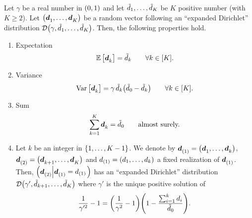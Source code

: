 \begin{prop}\label{prop:demand-distribution:properties}
Let $\gamma$ be a real number in $\bracket{0,1}$ and let $\tilde{d}_1,\ldots,\tilde{d}_K$ be $K$ positive number (with $K\ge2$).
Let $\bracket{\va\demand_1,\ldots,\va\demand_K}$ be a random vector following an ``expanded Dirichlet'' distribution $\cD\bracket{\gamma,\tilde{\demand}_1,\ldots,\tilde{\demand}_K}$.
Then, the following properties hold.
\begin{enumerate}
  \item\label{enum:PDP:random-demand-property:expectation}
  Expectation%
  \begin{equation}
    \espe\sqbracket{\va\demand_k} = \tilde{\demand}_k\qquad\forall k\in\range{K}.
  \end{equation}
  \item\label{enum:PDP:random-demand-property:variance}
  Variance%
  \begin{equation}\label{eq:PDP:numerical-experiments:demand:variance}
    \vari\sqbracket{\va\demand_k}=\gamma\,\tilde{\demand}_k\bracket{\tilde{\demand}_0-\tilde{\demand}_k}\qquad\forall k\in\range{K}.
  \end{equation}
  \item\label{enum:PDP:random-demand-property:constant-volume}
  Sum%
  \begin{equation}
    \sum_{k=1}^{K}\va\demand_k = \tilde{\demand}_0\qquad\mbox{almost surely.}
  \end{equation}
  \item\label{enum:PDP:random-demand-property:past-conditional}
  Let $k$ be an integer in $\range[1]{K-1}$. We denote by $\va\demand_{(1)}=\bracket{\va\demand_1,\ldots,\va\demand_k}$, $\va\demand_{(2)}=\bracket{\va\demand_{k+1},\ldots,\va\demand_K}$ and $\demand_{(1)}=\bracket{\demand_1,\ldots,\demand_k}$ a fixed realization of $\va\demand_{(1)}$.
  Then, $\bracket{\va\demand_{(2)}\left|\va\demand_{(1)}=\demand_{(1)}\right.}$ has an ``expanded Dirichlet'' distribution $\cD\bracket{\gamma',\tilde{\demand}_{k+1},\ldots,\tilde{\demand}_K}$
  where $\gamma'$ is the unique positive solution of
  \begin{equation}\label{eq:PDP:random-demand-property:past-conditional:gamma}
    \frac{1}{\gamma'^2}-1 = \bracket{\frac{1}{\gamma^2}-1}\bracket{1-\frac{\sum_{i=1}^k \demand_i}{\tilde{\demand}_0}}.
  \end{equation}
\end{enumerate}
\end{prop}


